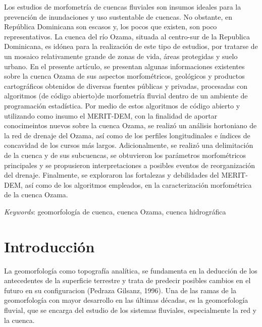 \documentclass[11pt,]{article}
\renewenvironment{abstract}
 {{%
    \setlength{\leftmargin}{0mm}
    \setlength{\rightmargin}{\leftmargin}%
  }%
  \relax}
 {\endlist}
\begin{document}
\begin{abstract}

    \hbox{\vrule height .2pt width 39.14pc}

    \vskip 8.5pt %

\noindent Los estudios de morfometría de cuencas fluviales son insumos ideales
para la prevención de inundaciones y uso sustentable de cuencas. No
obstante, en República Dominicana son escasos y, los pocos que existen,
son poco representativos. La cuenca del río Ozama, situada al centro-sur
de la Republica Dominicana, es idónea para la realización de este tipo
de estudios, por tratarse de un mosaico relativamente grande de zonas de
vida, áreas protegidas y suelo urbano. En el presente artículo, se
presentan algunas informaciones existentes sobre la cuenca Ozama de sus
aspectos morfométricos, geológicos y productos cartográficos obtenidos
de diversas fuentes públicas y privadas, procesadas con algoritmos (de
código abierto)de morfometría fluvial dentro de un ambiente de
programación estadística. Por medio de estos algoritmos de código
abierto y utilizando como insumo el MERIT-DEM, con la finalidad de
aportar conocimeintos nuevos sobre la cuenca Ozama, se realizó un
análisis hortoniano de la red de drenaje del Ozama, así como de los
perfiles longitudinales e índices de concavidad de los cursos más
largos. Adicionalmente, se realizó una delimitación de la cuenca y de
sus subcuencas, se obtuvieron los parámetros morfométricos principales y
se propusieron interpretaciones a posibles eventos de reorganización del
drenaje. Finalmente, se exploraron las fortalezas y debilidades del
MERIT-DEM, así como de los algoritmos empleados, en la caracterización
morfométrica de la cuenca Ozama.


\vskip 8.5pt \noindent \emph{Keywords}: geomorfología de cuenca, cuenca Ozama, cuenca hidrográfica \par

    \hbox{\vrule height .2pt width 39.14pc}



\end{abstract}


\vskip 6.5pt


\noindent  \section{Introducción}\label{introducciuxf3n}

La geomorfología como topografía analítica, se fundamenta en la
deducción de los antecedentes de la superficie terrestre y trata de
predecir posibles cambios en el futuro en su configuracion (Pedraza
Gilsanz, 1996). Una de las ramas de la geomorfología con mayor
desarrollo en las últimas décadas, es la geomorfología fluvial, que se
encarga del estudio de los sistemas fluviales, especialmente la red y la
cuenca.
\end{document}
